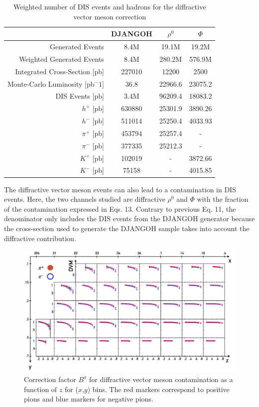 \documentclass[letterpaper,12pt]{article}
\begin{document}
\begin{table}
	\centering
	\begin{tabular}{rccc}
    \hline
     & DJANGOH & $\rho^0$ & $\Phi$ \\
    \hline
    Generated Events & 8.4M & 19.1M & 19.2M  \\
    Weighted Generated Events & 8.4M & 280.2M & 576.9M  \\
		Integrated Cross-Section [pb] & 227010 & 12200 & 2500  \\
		Monte-Carlo Luminosity [pb$^-1$] & 36.8 & 22966.6 & 23075.2  \\
    \hline
		DIS Events [pb] & 3.4M & 96209.4 & 18083.2  \\
		$h^+$ [pb] & 630880 & 25301.9 & 3890.26  \\
		$h^-$ [pb] & 511014 & 25250.4 & 4033.93  \\
		$\pi^+$ [pb] & 453794 & 25257.4 & -  \\
		$\pi^-$ [pb] & 377335 & 25212.3 & -  \\
		$K^+$ [pb] & 102019 & - & 3872.66  \\
		$K^-$ [pb] & 75158 & - & 4015.85 \\
  \end{tabular}
  \caption{Weighted number of DIS events and hadrons for the diffractive vector meson correction}
  \label{DVM}
\end{table}

The diffractive vector meson events can also lead to a contamination in DIS events. Here, the two channels studied are diffractive $\rho^0$ and $\Phi$
with the fraction of the contamination expressed in Eqs. 13. Contrary to previous Eq. 11, the denominator only includes the DIS events from the
DJANGOH generator because the cross-section used to generate the DJANGOH sample takes into account the diffractive contribution.

\begin{figure}
	\includegraphics[scale=0.5]{./gfx/DVMpi.png}
	\caption{Correction factor $B^{\pi}$ for diffractive vector meson contamination as a function of $z$ for ($x$,$y$) bins. The red markers correspond to positive pions and blue markers for negative pions.}
	\label{DVMpi}
\end{figure}
\end{document}
